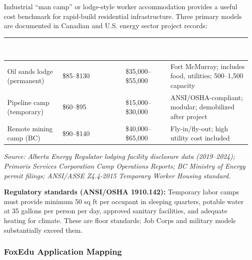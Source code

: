 \documentclass[11pt,letterpaper]{article}
\newcommand{\tableheader}[1]{\textbf{\sffamily\textcolor{white}{#1}}}
\begin{document}
Industrial ``man camp'' or lodge-style worker accommodation provides a useful cost benchmark for rapid-build residential infrastructure. Three primary models are documented in Canadian and U.S. energy sector project records:

\begin{center}
\begin{tabularx}{\textwidth}{L{3cm}C{2cm}C{2.5cm}X}
\toprule
{}
\tableheader{Model} & \tableheader{Cost/Bed/Night} & \tableheader{Build Cost/Bed} & \tableheader{Context} \\
\midrule
Oil sands lodge (permanent) & \$85--\$130 & \$35,000--\$55,000 & Fort McMurray; includes food, utilities; 500--1,500 capacity \\
Pipeline camp (temporary) & \$60--\$95 & \$15,000--\$30,000 & ANSI/OSHA-compliant; modular; demobilized after project \\
Remote mining camp (BC) & \$90--\$140 & \$40,000--\$65,000 & Fly-in/fly-out; high utility cost included \\
\bottomrule
\end{tabularx}
\end{center}

\textit{Source: Alberta Energy Regulator lodging facility disclosure data (2019--2024); Primoris Services Corporation Camp Operations Reports; BC Ministry of Energy permit filings; ANSI/ASSE Z4.4-2015 Temporary Worker Housing standard.}

\textbf{Regulatory standards (ANSI/OSHA 1910.142):} Temporary labor camps must provide minimum 50 sq ft per occupant in sleeping quarters, potable water at 35 gallons per person per day, approved sanitary facilities, and adequate heating for climate. These are floor standards; Job Corps and military models substantially exceed them.

\subsubsection{FoxEdu Application Mapping}
\end{document}
